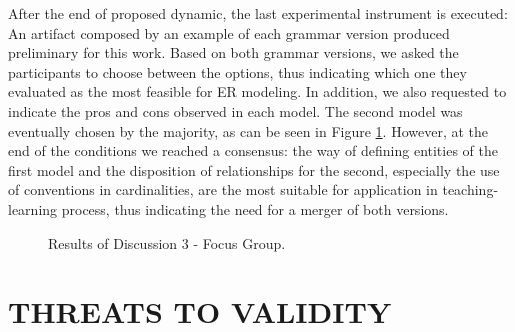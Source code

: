 \documentclass[a4paper,twoside,anonymous]{article}
\begin{document}
After the end of proposed dynamic, the last experimental instrument is executed: An artifact composed by an example of each grammar version produced preliminary for this work. 
Based on both grammar versions, we asked the participants to choose between the options, thus indicating which one they evaluated as the most feasible for ER modeling.
In addition, we also requested to indicate the pros and cons observed in each model.
The second model was eventually chosen by the majority, as can be seen in Figure \ref{fig:disc3GPfocalGrafico}.
However, at the end of the conditions we reached a consensus: the way of defining entities of the first model and the disposition of relationships for the second, especially the use of conventions in cardinalities, are the most suitable for application in teaching-learning process, thus indicating the need for a merger of both versions.

\begin{figure}[!htb]
    \centering
    
    \caption{Results of Discussion 3 - Focus Group.}
    \label{fig:disc3GPfocalGrafico}
\end{figure}


\section{\uppercase{Threats to Validity}}
\label{sec:threats}
\end{document}
